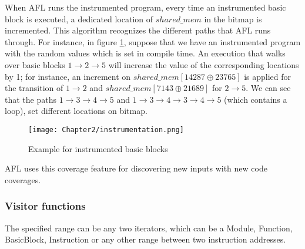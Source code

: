 \vspace{\baselineskip}

When AFL runs the instrumented program, every time an instrumented basic block is executed, a dedicated location of $shared\_mem$ in the bitmap is incremented. This algorithm recognizes the different paths that AFL runs through. For instance, in figure \ref{fig:instrumentation}, suppose that we have an instrumented program with the random values which is set in compile time. An execution that walks over basic blocks $1\rightarrow2\rightarrow5$ will increase the value of the corresponding locations by 1; for instance, an increment on $shared\_mem[14287 \oplus 23765]$ is applied for the transition of $1\rightarrow2$ and $shared\_mem[7143 \oplus 21689]$ for $2\rightarrow5$. We can see that the paths $1\rightarrow3\rightarrow4\rightarrow5$ and $1\rightarrow3\rightarrow4\rightarrow3\rightarrow4\rightarrow5$ (which contains a loop), set different locations on bitmap.


\begin{figure}[htpb]
    \texttt{[image: Chapter2/instrumentation.png]}
    \centering
    \captionsetup{justification=centering}
    \caption{Example for instrumented basic blocks}
    \label{fig:instrumentation}
\end{figure}

AFL uses this coverage feature for discovering new inputs with new code coverages.

\subsubsection*{Visitor functions}




The specified range can be any two iterators, which can be a Module, Function, BasicBlock, Instruction or any other range between two instruction addresses.
